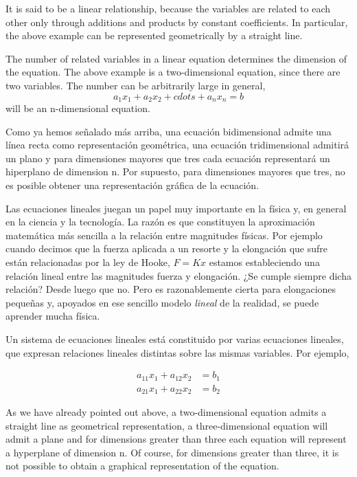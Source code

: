 \begin{paracol}{2}
It is said to be a linear relationship, because the variables are related to each other only through additions and products by constant coefficients. In particular, the above example can be represented geometrically by a straight line.

The number of related variables in a linear equation determines the dimension of the equation. The above example is a two-dimensional equation, since there are two variables. The number can be arbitrarily large in general,
\begin{equation*}
a_1x_1+a_2x_2+cdots +a_nx_n=b
\end{equation*} 
will be an n-dimensional equation.

\switchcolumn
Como ya hemos señalado más arriba, una ecuación bidimensional admite una línea recta como representación geométrica, una ecuación tridimensional admitirá un plano y para dimensiones mayores que tres cada ecuación representará un hiperplano de dimension n. Por supuesto, para dimensiones mayores que tres, no es posible obtener una representación gráfica de la ecuación.

Las ecuaciones lineales juegan un papel muy importante en la física y, en general en la ciencia y la tecnología. La razón es que constituyen la aproximación matemática más sencilla a la relación entre magnitudes físicas. Por ejemplo cuando decimos que la fuerza aplicada a un resorte y la elongación  que sufre están relacionadas por la ley de Hooke, $F=Kx$ estamos estableciendo una relación lineal entre las magnitudes fuerza y elongación. ¿Se cumple siempre dicha relación? Desde luego que no. Pero es razonablemente cierta para elongaciones pequeñas y, apoyados en ese sencillo modelo \emph{lineal} de la realidad, se puede aprender mucha física.

Un sistema de ecuaciones lineales está constituido por varias ecuaciones lineales, que expresan relaciones lineales distintas sobre las mismas variables. Por ejemplo,

\begin{align*}
a_{11}x_1+a_{12}x_2&=b_1\\
a_{21}x_1+a_{22}x_2&=b_2
\end{align*}

\switchcolumn
As we have already pointed out above, a two-dimensional equation admits a straight line as geometrical representation, a three-dimensional equation will admit a plane and for dimensions greater than three each equation will represent a hyperplane of dimension n. Of course, for dimensions greater than three, it is not possible to obtain a graphical representation of the equation.


\end{paracol}
